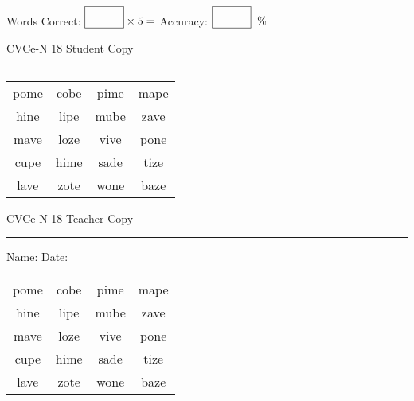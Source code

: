 \documentclass{memoir}
\begin{document}
\small

Words Correct: $\fbox{\phantom{\huge 100}} \times 5 = $ Accuracy: $\fbox{\phantom{\huge 100}}\;\; \%$ 

\vfill

\newpage


\footnotesize \noindent
CVCe-N 18 \hfill Student Copy
\smallskip
\hrule

\Large

\setlength{\tabcolsep}{14pt}
\def\arraystretch{2}

{\selectfont


\begin{vplace}[0.5]
\begin{center}
\begin{tabular}{cccc}
pome & cobe & pime & mape \\
hine & lipe & mube & zave \\
mave & loze & vive & pone \\
cupe & hime & sade & tize \\
lave & zote & wone & baze \\
\end{tabular}
\end{center}
\end{vplace}

}

\newpage

\footnotesize \noindent
CVCe-N 18 \hfill Teacher Copy
\smallskip
\hrule

\small

\vfill

\noindent
Name: \underline{\hspace{1.75in}} \hfill Date: \underline{\hspace{1in}}

\Large

{\selectfont


\begin{vplace}[0.5]
\begin{center}
\begin{tabular}{cccc}
pome & cobe & pime & mape \\
hine & lipe & mube & zave \\
mave & loze & vive & pone \\
cupe & hime & sade & tize \\
lave & zote & wone & baze \\
\end{tabular}
\end{center}
\end{vplace}



}
\end{document}
